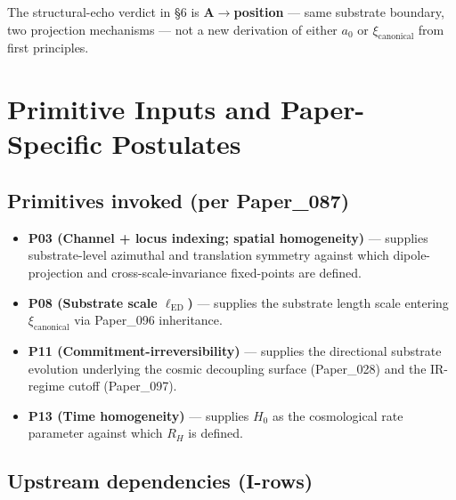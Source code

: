 \documentclass[11pt,a4paper]{article}
\begin{document}
The structural-echo verdict in \S6 is \textbf{A$\to$position} --- same substrate boundary, two projection mechanisms --- not a new derivation of either $a_0$ or $\xi_\mathrm{canonical}$ from first principles.

\section{Primitive Inputs and Paper-Specific Postulates}

\subsection{Primitives invoked (per Paper\_087)}

\begin{itemize}[noitemsep]
\item \textbf{P03 (Channel + locus indexing; spatial homogeneity)} --- supplies substrate-level azimuthal and translation symmetry against which dipole-projection and cross-scale-invariance fixed-points are defined.
\item \textbf{P08 (Substrate scale $\ell_\mathrm{ED}$)} --- supplies the substrate length scale entering $\xi_\mathrm{canonical}$ via Paper\_096 inheritance.
\item \textbf{P11 (Commitment-irreversibility)} --- supplies the directional substrate evolution underlying the cosmic decoupling surface (Paper\_028) and the IR-regime cutoff (Paper\_097).
\item \textbf{P13 (Time homogeneity)} --- supplies $H_0$ as the cosmological rate parameter against which $R_H$ is defined.
\end{itemize}

\subsection{Upstream dependencies (I-rows)}
\end{document}
